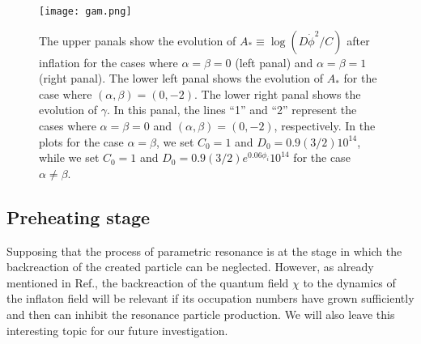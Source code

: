 \documentclass[aps,prd,amsmath,amssymb,preprintnumbers,onecolumn,11pt,nofootinbib]{revtex4}
\begin{document}
\begin{figure}[t]
\begin{center}		
\texttt{[image: gam.png]}
\caption{\label{fig:evo}
The upper panals show the evolution of $A_* \equiv \log(D \dot\phi^2 /C)$ after inflation for the cases  where $\alpha = \beta = 0$ (left panal) and $\alpha = \beta =1$ (right panal).
The lower left panal shows the evolution of $A_*$ for the case where $(\alpha,\beta) = (0,-2)$.
The lower right panal shows the evolution of $\gamma$.
In this panal, the lines ``1'' and ``2'' represent the cases where $\alpha = \beta =0$ and $(\alpha,\beta) = (0,-2)$, respectively.
In the plots for the case $\alpha=\beta$, we set $C_0 = 1$ and $D_0 = 0.9 (3/2) 10^{14}$,
while we set $C_0 =1$ and $D_0 = 0.9 (3/2) e^{0.06 \phi_i}
10^{14}$ for the case $\alpha \neq \beta$.
}
\end{center}
\end{figure}

\subsection{Preheating stage}
\label{preheat}
Supposing that the process of parametric resonance is at the stage in which the backreaction of the created particle can be neglected. However, as already mentioned in Ref.\cite{GarciaBellido:2008ab}, the backreaction of the quantum field $\chi$ to the dynamics of the inflaton field will be relevant if its occupation numbers have grown sufficiently and then can inhibit the resonance particle production. We will also leave this interesting topic for our future investigation.    
\end{document}
